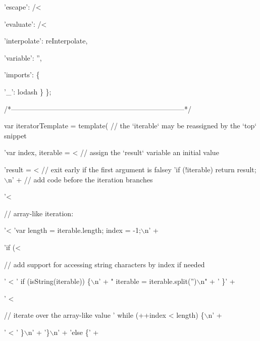 \begin{DoxyCodeInclude}
      \textcolor{stringliteral}{'escape'}: /<%

      \textcolor{stringliteral}{'evaluate'}: /<%

      \textcolor{stringliteral}{'interpolate'}: reInterpolate,

      \textcolor{stringliteral}{'variable'}: \textcolor{stringliteral}{''},

      \textcolor{stringliteral}{'imports'}: \{

        \textcolor{charliteral}{'\_'}: lodash
      \}
    \};

    \textcolor{comment}{/*--------------------------------------------------------------------------*/}

    var iteratorTemplate = \textcolor{keyword}{template}(
      \textcolor{comment}{// the `iterable` may be reassigned by the `top` snippet}
      \textcolor{stringliteral}{'var index, iterable = <%
      \textcolor{comment}{// assign the `result` variable an initial value}
      \textcolor{stringliteral}{'result = <%
      \textcolor{comment}{// exit early if the first argument is falsey}
      \textcolor{stringliteral}{'if (!iterable) return result;\(\backslash\)n'} +
      \textcolor{comment}{// add code before the iteration branches}
      \textcolor{stringliteral}{'<%

      \textcolor{comment}{// array-like iteration:}
      \textcolor{stringliteral}{'<%
      \textcolor{stringliteral}{'var length = iterable.length; index = -1;\(\backslash\)n'} +
      \textcolor{stringliteral}{'if (<%

      \textcolor{comment}{// add support for accessing string characters by index if needed}
      \textcolor{stringliteral}{'  <%
      \textcolor{stringliteral}{'  if (isString(iterable)) \{\(\backslash\)n'} +
      \textcolor{stringliteral}{"    iterable = iterable.split('')\(\backslash\)n"} +
      \textcolor{stringliteral}{'  \}'} +
      \textcolor{stringliteral}{'  <%

      \textcolor{comment}{// iterate over the array-like value}
      \textcolor{stringliteral}{'  while (++index < length) \{\(\backslash\)n'} +
      \textcolor{stringliteral}{'    <%
      \textcolor{stringliteral}{'  \}\(\backslash\)n'} +
      \textcolor{stringliteral}{'\}\(\backslash\)n'} +
      \textcolor{stringliteral}{'else \{'} +

}}}}}}}}
\end{DoxyCodeInclude}
